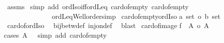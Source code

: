 \begin{isabellebody}
%
\endisadelimproof
%
\isatagproof
{}\isamarkupfalse%
\ assms\isanewline
{}\isamarkupfalse%
\ {\isacharparenleft}{\kern0pt}simp\ add{\isacharcolon}{\kern0pt}\ ordIso{\isacharunderscore}{\kern0pt}iff{\isacharunderscore}{\kern0pt}ordLeq\ card{\isacharunderscore}{\kern0pt}of{\isacharunderscore}{\kern0pt}empty{}\ card{\isacharunderscore}{\kern0pt}of{\isacharunderscore}{\kern0pt}empty{}\isanewline
\ \ \ \ \ \ \ \ \ \ \ \ \ \ ordLeq{\isacharunderscore}{\kern0pt}Well{\isacharunderscore}{\kern0pt}order{\isacharunderscore}{\kern0pt}simp{\isacharparenright}{\kern0pt}%
\endisatagproof
{\isafoldproof}%
%
\isadelimproof
\isanewline
%
\endisadelimproof
\isanewline
{}\isamarkupfalse%
\ card{\isacharunderscore}{\kern0pt}of{\isacharunderscore}{\kern0pt}empty{\isacharunderscore}{\kern0pt}ordIso{\isacharcolon}{\kern0pt}\isanewline
{\isachardoublequoteopen}{\isacharbar}{\kern0pt}{\isacharbraceleft}{\kern0pt}{\isacharbraceright}{\kern0pt}{\isacharcolon}{\kern0pt}{\isacharcolon}{\kern0pt}{\isacharprime}{\kern0pt}a\ set{\isacharbar}{\kern0pt}\ {\isacharequal}{\kern0pt}o\ {\isacharbar}{\kern0pt}{\isacharbraceleft}{\kern0pt}{\isacharbraceright}{\kern0pt}{\isacharcolon}{\kern0pt}{\isacharcolon}{\kern0pt}{\isacharprime}{\kern0pt}b\ set{\isacharbar}{\kern0pt}{\isachardoublequoteclose}\isanewline
%
\isadelimproof
%
\endisadelimproof
%
\isatagproof
{}\isamarkupfalse%
\ card{\isacharunderscore}{\kern0pt}of{\isacharunderscore}{\kern0pt}ordIso\ \isamarkupfalse%
\ bij{\isacharunderscore}{\kern0pt}betw{\isacharunderscore}{\kern0pt}def\ inj{\isacharunderscore}{\kern0pt}on{\isacharunderscore}{\kern0pt}def\ \isamarkupfalse%
\ blast%
\endisatagproof
{\isafoldproof}%
%
\isadelimproof
\isanewline
%
\endisadelimproof
\isanewline
{}\isamarkupfalse%
\ card{\isacharunderscore}{\kern0pt}of{\isacharunderscore}{\kern0pt}image{\isacharcolon}{\kern0pt}\isanewline
{\isachardoublequoteopen}{\isacharbar}{\kern0pt}f\ {\isacharbackquote}{\kern0pt}\ A{\isacharbar}{\kern0pt}\ {\isacharless}{\kern0pt}{\isacharequal}{\kern0pt}o\ {\isacharbar}{\kern0pt}A{\isacharbar}{\kern0pt}{\isachardoublequoteclose}\isanewline
%
\isadelimproof
%
\endisadelimproof
%
\isatagproof
{}\isamarkupfalse%
{\isacharparenleft}{\kern0pt}cases\ {\isachardoublequoteopen}A\ {\isacharequal}{\kern0pt}\ {\isacharbraceleft}{\kern0pt}{\isacharbraceright}{\kern0pt}{\isachardoublequoteclose}{\isacharcomma}{\kern0pt}\ simp\ add{\isacharcolon}{\kern0pt}\ card{\isacharunderscore}{\kern0pt}of{\isacharunderscore}{\kern0pt}empty{\isacharparenright}{\kern0pt}\isanewline

\end{isabellebody}
